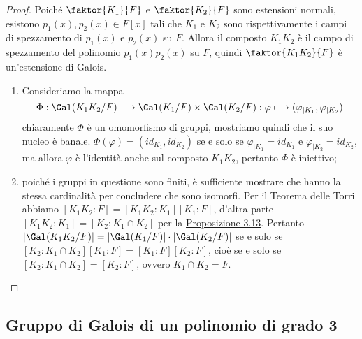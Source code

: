 \documentclass[11pt]{scrartcl}
\begin{document}
	\begin{proof}
		Poiché $\faktor{K_1}{F}$ e $\faktor{K_2}{F}$ sono estensioni normali, 
		esistono $p_1(x), p_2(x) \in F[x]$ tali che $K_1$ e $K_2$ 
		sono rispettivamente i campi di spezzamento di $p_1(x)$ e $p_2(x)$ su 
		$F$. Allora il composto $K_1K_2$ è il campo di spezzamento  
		del polinomio $p_1(x)p_2(x)$ su $F$, quindi $\faktor{K_1K_2}{F}$ è un'estensione 
		di Galois.
		\begin{enumerate}[(1)]
			\item Consideriamo la mappa
			\[
			\Phi: \Gal(K_1K_2/F)\longrightarrow \Gal(K_1/F)\times 
			\Gal(K_2/F): \varphi\longmapsto (\varphi_{\mid K_1}, \varphi_{\mid K_2})
			\]
			chiaramente $\Phi$ è un omomorfismo di gruppi, mostriamo quindi che 
			il suo nucleo è banale. $\Phi(\varphi) = (id_{K_1}, id_{K_2})$
			se e solo se $\varphi_{\mid K_1} = id_{K_1}$ e $\varphi_{\mid K_2} =
			id_{K_2}$, ma allora $\varphi$ è l'identità anche sul composto
			$K_1K_2$, pertanto $\Phi$ è iniettivo;
			\item poiché i gruppi in questione sono finiti, è sufficiente mostrare 
			che hanno la stessa cardinalità per concludere che sono isomorfi.
			Per il Teorema delle Torri abbiamo $[K_1K_2:F] = [K_1K_2:K_1][K_1:F]$,
			d'altra parte $[K_1K_2:K_1] = [K_2:K_1\cap K_2]$ per
			la \hyperref[prop3.13]{Proposizione 3.13}. Pertanto $|\Gal(K_1K_2/F)| =
			|\Gal(K_1/F)|\cdot |\Gal(K_2/F)|$ 
			se e solo se $[K_2:K_1\cap K_2][K_1:F] = [K_1:F][K_2:F]$, cioè se e 
			solo se $[K_2:K_1\cap K_2] = [K_2:F]$, ovvero $K_1\cap K_2 = F$.
		\end{enumerate}
	\end{proof}
	
	\newpage
	
	\subsection{Gruppo di Galois di un polinomio di grado 3}
	
\end{document}
